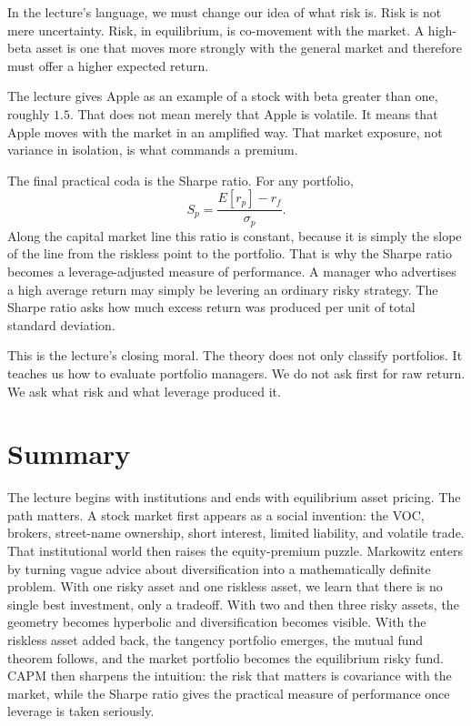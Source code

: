 In the lecture's language, we must change our idea of what risk is. Risk is not mere uncertainty. Risk, in equilibrium, is co-movement with the market. A high-beta asset is one that moves more strongly with the general market and therefore must offer a higher expected return.

The lecture gives Apple as an example of a stock with beta greater than one, roughly \(1.5\). That does not mean merely that Apple is volatile. It means that Apple moves with the market in an amplified way. That market exposure, not variance in isolation, is what commands a premium.

The final practical coda is the Sharpe ratio. For any portfolio,
\begin{equation}
S_p = \frac{E[r_p]-r_f}{\sigma_p}.
\end{equation}
Along the capital market line this ratio is constant, because it is simply the slope of the line from the riskless point to the portfolio. That is why the Sharpe ratio becomes a leverage-adjusted measure of performance. A manager who advertises a high average return may simply be levering an ordinary risky strategy. The Sharpe ratio asks how much excess return was produced per unit of total standard deviation.

This is the lecture's closing moral. The theory does not only classify portfolios. It teaches us how to evaluate portfolio managers. We do not ask first for raw return. We ask what risk and what leverage produced it.

\section{Summary}

The lecture begins with institutions and ends with equilibrium asset pricing. The path matters. A stock market first appears as a social invention: the VOC, brokers, street-name ownership, short interest, limited liability, and volatile trade. That institutional world then raises the equity-premium puzzle. Markowitz enters by turning vague advice about diversification into a mathematically definite problem. With one risky asset and one riskless asset, we learn that there is no single best investment, only a tradeoff. With two and then three risky assets, the geometry becomes hyperbolic and diversification becomes visible. With the riskless asset added back, the tangency portfolio emerges, the mutual fund theorem follows, and the market portfolio becomes the equilibrium risky fund. CAPM then sharpens the intuition: the risk that matters is covariance with the market, while the Sharpe ratio gives the practical measure of performance once leverage is taken seriously.